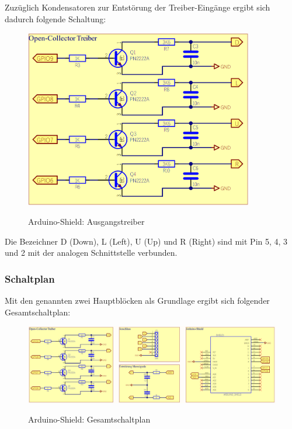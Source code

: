 Zuzüglich Kondensatoren zur Entstörung der Treiber-Eingänge ergibt sich dadurch folgende Schaltung:

\begin{figure}[H]
	\centering
	\includegraphics[width=10cm]{../ref/SchematicAusgangstreiberGS232.png}
	\label{fig:Schaltung_Ausgangstreiber_Arduino-Shield}
	\caption{Arduino-Shield: Ausgangstreiber}
\end{figure}

Die Bezeichner D (Down), L (Left), U (Up) und R (Right) sind mit Pin 5, 4, 3 und 2 mit der analogen Schnittstelle verbunden.

\subsubsection{Schaltplan}
Mit den genannten zwei Hauptblöcken als Grundlage ergibt sich folgender Gesamtschaltplan:
\begin{figure}[H]
	\centering
	\includegraphics[width=\linewidth]{../ref/SchematicFullGS232.png}
	\label{fig:Schaltung__Arduino-Shield}
	\caption{Arduino-Shield: Gesamtschaltplan}
\end{figure}

